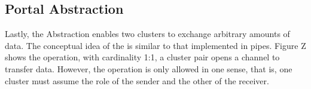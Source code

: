 		\subsection{Portal Abstraction}

			Lastly, the \portal Abstraction enables two clusters to exchange arbitrary
			amounts of data.
			The conceptual idea of ​​the \portal is similar to that implemented in \posix pipes.
			Figure Z shows the \portal operation, with cardinality 1:1, a cluster
			pair opens a channel to transfer data.
			However, the operation is only allowed in one sense, that is, one
			cluster must assume the role of the sender and the other of the receiver.
